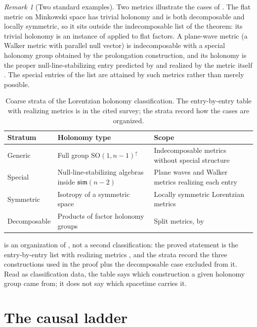 \documentclass[11pt,letterpaper]{article}
\theoremstyle{definition}
\theoremstyle{remark}
\newtheorem{remark}[theorem]{Remark}
\begin{document}
\begin{remark}[Two standard examples]\label{rem:holonomyexamples}
Two metrics illustrate the cases of . The flat metric on Minkowski space has trivial holonomy and is both decomposable and locally symmetric, so it sits outside the indecomposable list of the theorem: its trivial holonomy is an instance of  applied to flat factors. A plane-wave metric (a Walker metric with parallel null vector) is indecomposable with a special holonomy group obtained by the prolongation construction, and its holonomy is the proper null-line-stabilizing entry predicted by  and realized by the metric itself \cite{galaev}. The special entries of the list are attained by such metrics rather than merely possible.
\end{remark}

\begin{table}[t]
\centering
\caption{Coarse strata of the Lorentzian holonomy classification. The entry-by-entry table with realizing metrics is in the cited survey; the strata record how the cases are organized.}
\label{tab:holonomy}
\small
\begin{tabularx}{\textwidth}{L{0.24\textwidth}L{0.34\textwidth}X}
\toprule
Stratum & Holonomy type & Scope \\
\midrule
Generic & Full group $\mathrm{SO}(1,n-1)^{\uparrow}$ & Indecomposable metrics without special structure \\
Special & Null-line-stabilizing algebras inside $\mathfrak{sim}(n-2)$ & Plane waves and Walker metrics realizing each entry \\
Symmetric & Isotropy of a symmetric space & Locally symmetric Lorentzian metrics \\
Decomposable & Products of factor holonomy groups & Split metrics, by  \\
\bottomrule
\end{tabularx}
\end{table}

 is an organization of , not a second classification: the proved statement is the entry-by-entry list with realizing metrics \cite{galaev}, and the strata record the three constructions used in the proof plus the decomposable case excluded from it. Read as classification data, the table says which construction a given holonomy group came from; it does not say which spacetime carries it.

\section{The causal ladder}
\end{document}
